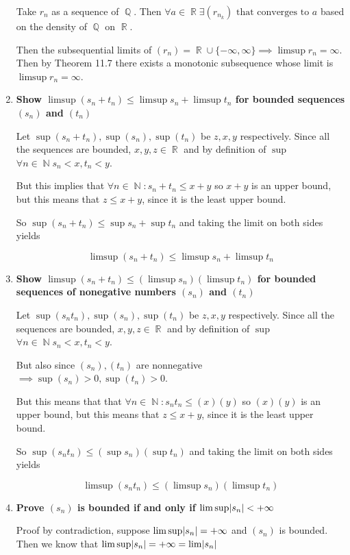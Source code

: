 \documentclass[10pt,a4paper]{article}
\DeclareMathOperator*{\R}{\mathbb{R}}
\DeclareMathOperator*{\Q}{\mathbb{Q}}
\DeclareMathOperator*{\N}{\mathbb{N}}
\DeclarePairedDelimiter{\abs}{\lvert}{\rvert}
\begin{document}
\begin{enumerate}
        Take $r_{n}$ as a sequence of $\Q$. Then $\forall a \in \R \exists (r_{n_k}) \text{ that converges to } a$ based on the density of $\Q$ on $\R$.

        Then the subsequential limits of $(r_n) = \R \cup \{ -\infty, \infty\} \implies \limsup r_n = \infty$. Then by Theorem 11.7 there exists a monotonic subsequence whose limit is $\limsup r_n = \infty$.

    \item \textbf{Show $\limsup (s_n + t_n) \leq \limsup s_n + \limsup t_n$ for bounded sequences $(s_n)$ and $(t_n)$ }

        Let $\sup (s_n + t_n), \sup(s_n), \sup(t_n)$ be $z, x, y$ respectively. Since all the sequences are bounded, $x, y, z \in \R$ and by definition of $\sup$ $\forall n \in \N s_n < x, t_n < y$. 

        But this implies that $\forall n \in \N: s_n + t_n \leq x+y$ so $x+y$ is an upper bound, but this means that $z \leq x+y$, since it is the least upper bound. 

        So $\sup (s_n + t_n) \leq \sup s_n + \sup t_n$ and taking the limit on both sides yields

        $$\limsup (s_n + t_n) \leq \limsup s_n + \limsup t_n$$

    \item \textbf{Show $\limsup (s_n + t_n) \leq (\limsup s_n)(\limsup t_n)$ for bounded sequences of nonegative numbers $(s_n)$ and $(t_n)$ }

        Let $\sup (s_n t_n), \sup(s_n), \sup(t_n)$ be $z, x, y$ respectively. Since all the sequences are bounded, $x, y, z \in \R$ and by definition of $\sup$ $\forall n \in \N s_n < x, t_n < y$. 

        But also since $(s_n), (t_n)$ are nonnegative $\implies \sup (s_n) > 0, \sup (t_n) > 0$.

        But this means that that $\forall n \in \N: s_n t_n \leq (x)(y)$ so $(x)(y)$ is an upper bound, but this means that $z \leq x+y$, since it is the least upper bound. 

        So $\sup (s_n t_n) \leq (\sup s_n)  (\sup t_n)$ and taking the limit on both sides yields

        $$\limsup (s_n t_n) \leq (\limsup s_n)  (\limsup t_n)$$

    \item \textbf{Prove $(s_n)$ is bounded if and only if $\limsup\abs{s_n} < +\infty$ }

        Proof by contradiction, suppose $\limsup\abs{s_n} = +\infty$ and $(s_n)$ is bounded. Then we know that $\limsup \abs{s_n} = +\infty = \lim \abs{s_n}$ 


\end{enumerate}
\end{document}
